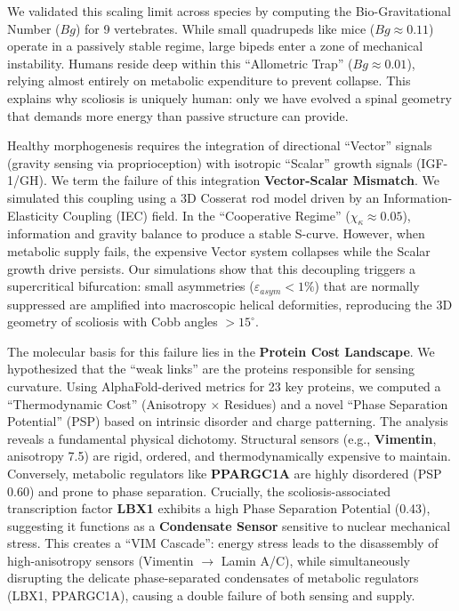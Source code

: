 \documentclass[11pt]{article}
\begin{document}
We validated this scaling limit across species by computing the Bio-Gravitational Number ($Bg$) for 9 vertebrates. While small quadrupeds like mice ($Bg \approx 0.11$) operate in a passively stable regime, large bipeds enter a zone of mechanical instability. Humans reside deep within this ``Allometric Trap'' ($Bg \approx 0.01$), relying almost entirely on metabolic expenditure to prevent collapse. This explains why scoliosis is uniquely human: only we have evolved a spinal geometry that demands more energy than passive structure can provide.

Healthy morphogenesis requires the integration of directional ``Vector'' signals (gravity sensing via proprioception) with isotropic ``Scalar'' growth signals (IGF-1/GH). We term the failure of this integration \textbf{Vector-Scalar Mismatch}. We simulated this coupling using a 3D Cosserat rod model driven by an Information-Elasticity Coupling (IEC) field. In the ``Cooperative Regime'' ($\chi_\kappa \approx 0.05$), information and gravity balance to produce a stable S-curve. However, when metabolic supply fails, the expensive Vector system collapses while the Scalar growth drive persists. Our simulations show that this decoupling triggers a supercritical bifurcation: small asymmetries ($\varepsilon_{asym} < 1\%$) that are normally suppressed are amplified into macroscopic helical deformities, reproducing the 3D geometry of scoliosis with Cobb angles $>15^\circ$.

The molecular basis for this failure lies in the \textbf{Protein Cost Landscape}. We hypothesized that the ``weak links'' are the proteins responsible for sensing curvature. Using AlphaFold-derived metrics for 23 key proteins, we computed a ``Thermodynamic Cost'' (Anisotropy $\times$ Residues) and a novel ``Phase Separation Potential'' (PSP) based on intrinsic disorder and charge patterning. The analysis reveals a fundamental physical dichotomy. Structural sensors (e.g., \textbf{Vimentin}, anisotropy 7.5) are rigid, ordered, and thermodynamically expensive to maintain. Conversely, metabolic regulators like \textbf{PPARGC1A} are highly disordered (PSP 0.60) and prone to phase separation. Crucially, the scoliosis-associated transcription factor \textbf{LBX1} exhibits a high Phase Separation Potential (0.43), suggesting it functions as a \textbf{Condensate Sensor} sensitive to nuclear mechanical stress. This creates a ``VIM Cascade'': energy stress leads to the disassembly of high-anisotropy sensors (Vimentin $\to$ Lamin A/C), while simultaneously disrupting the delicate phase-separated condensates of metabolic regulators (LBX1, PPARGC1A), causing a double failure of both sensing and supply.
\end{document}
